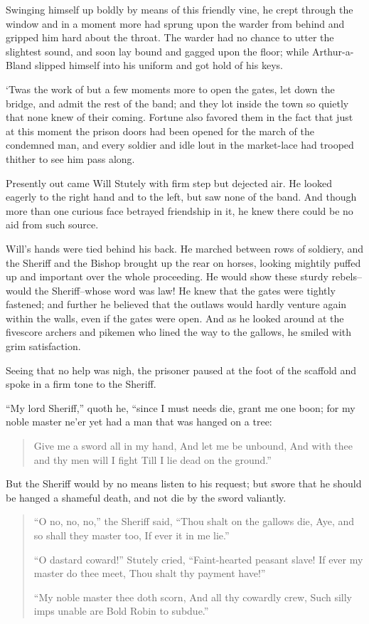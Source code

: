 Swinging himself up boldly by means of this friendly vine, he crept
through the window and in a moment more had sprung upon the warder from
behind and gripped him hard about the throat. The warder had no chance
to utter the slightest sound, and soon lay bound and gagged upon the
floor; while Arthur-a-Bland slipped himself into his uniform and got
hold of his keys.

`Twas the work of but a few moments more to open the gates, let down the
bridge, and admit the rest of the band; and they lot inside the town so
quietly that none knew of their coming. Fortune also favored them in the
fact that just at this moment the prison doors had been opened for the
march of the condemned man, and every soldier and idle lout in the
market-lace had trooped thither to see him pass along.

Presently out came Will Stutely with firm step but dejected air. He
looked eagerly to the right hand and to the left, but saw none of the
band. And though more than one curious face betrayed friendship in it,
he knew there could be no aid from such source.

Will's hands were tied behind his back. He marched between rows of
soldiery, and the Sheriff and the Bishop brought up the rear on horses,
looking mightily puffed up and important over the whole proceeding. He
would show these sturdy rebels--would the Sheriff--whose word was law!
He knew that the gates were tightly fastened; and further he believed
that the outlaws would hardly venture again within the walls, even if
the gates were open. And as he looked around at the fivescore archers
and pikemen who lined the way to the gallows, he smiled with grim
satisfaction.

Seeing that no help was nigh, the prisoner paused at the foot of the
scaffold and spoke in a firm tone to the Sheriff.

``My lord Sheriff,'' quoth he, ``since I must needs die, grant me one
boon; for my noble master ne'er yet had a man that was hanged on a tree:

\begin{quote}
Give me a sword all in my hand,
And let me be unbound,
And with thee and thy men will I fight
Till I lie dead on the ground.”
\end{quote}

But the Sheriff would by no means listen to his request; but swore that
he should be hanged a shameful death, and not die by the sword
valiantly.

\begin{quote}
“O no, no, no,” the Sheriff said,
“Thou shalt on the gallows die,
Aye, and so shall they master too,
If ever it in me lie.”

“O dastard coward!” Stutely cried,
“Faint-hearted peasant slave!
If ever my master do thee meet,
Thou shalt thy payment have!”

“My noble master thee doth scorn,
And all thy cowardly crew,
Such silly imps unable are
Bold Robin to subdue.”
\end{quote}

